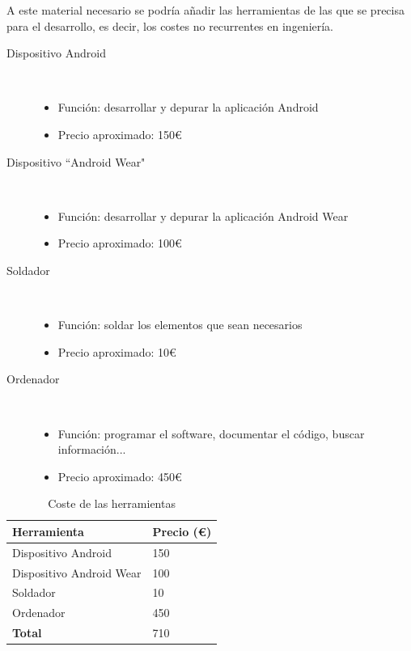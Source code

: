 A este material necesario se podría añadir las herramientas de las que se precisa
para el desarrollo, es decir, los costes no recurrentes en ingeniería.\\

\begin{description}
  \item [Dispositivo Android]\hfill \\
    \begin{itemize}
      \item {Función: desarrollar y depurar la aplicación Android}
      \item {Precio aproximado: 150\euro}
    \end{itemize}
  \item [Dispositivo ``Android Wear"]\hfill \\
    \begin{itemize}
      \item {Función: desarrollar y depurar la aplicación Android Wear}
      \item {Precio aproximado: 100\euro}
    \end{itemize}
  \item [Soldador]\hfill \\
    \begin{itemize}
      \item {Función: soldar los elementos que sean necesarios}
      \item {Precio aproximado: 10\euro}
    \end{itemize}
    \item [Ordenador]\hfill \\
      \begin{itemize}
        \item {Función: programar el software, documentar el código, buscar información...}
        \item {Precio aproximado: 450\euro}
      \end{itemize}
\end{description}

\begin{table}[h]
\centering
\begin{tabular}{ll}
\hline
\rowcolor[HTML]{9698ED}
{\bf Herramienta}        & {\bf Precio (\euro)} \\ \hline
Dispositivo Android      & 150                  \\
Dispositivo Android Wear & 100                  \\
Soldador                 & 10                   \\
Ordenador                & 450                  \\
\rowcolor[HTML]{CBCEFB}
{\bf Total}              & 710                  \\ \hline
\end{tabular}
\caption{Coste de las herramientas}
\label{costedelasherramientas}
\end{table}



